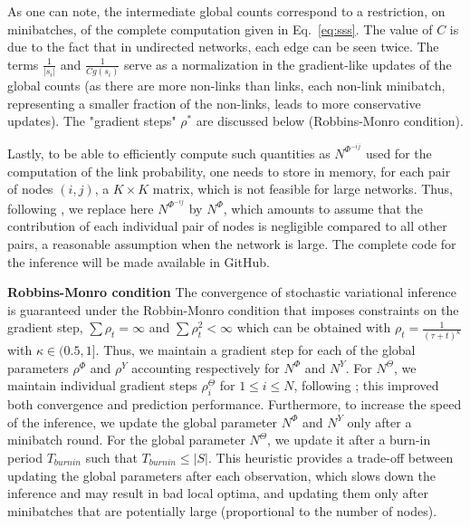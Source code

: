 %
As one can note, the intermediate global counts correspond to a restriction, on minibatches, of the complete computation given in Eq.~\ref{eq:sss}. The value of $C$ is due to the fact that in undirected networks, each edge can be seen twice. The terms $\frac{1}{|s_i|}$ and $\frac{1}{Cg(s_i)}$ serve as a normalization in the gradient-like updates of the global counts (as there are more non-links than links, each non-link minibatch, representing a smaller fraction of the non-links, leads to more conservative updates). The "gradient steps" $\rho^*$ are discussed below (Robbins-Monro condition).

Lastly, to be able to efficiently compute such quantities as $N^{\Phi^{-ij}}$ used for the computation of the link probability, one needs to store in memory, for each pair of nodes $(i,j)$, a $K \times K$ matrix, which is not feasible for large networks. Thus, following \cite{foulds2013stochastic}, we replace here $N^{\Phi^{-ij}}$ by $N^{\Phi}$, which amounts to assume that the contribution of each individual pair of nodes is negligible compared to all other pairs, a reasonable assumption when the network is large. The complete code for the inference will be made available in GitHub.

\textbf{Robbins-Monro condition} The convergence of stochastic variational inference is guaranteed under the Robbin-Monro condition \cite{robbins1951stochastic} that imposes constraints on the gradient step, $\sum \rho_t = \infty$ and $\sum \rho_t^2 < \infty$ which can be obtained with $\rho_t = \frac{1}{(\tau +t)^\kappa}$ with $\kappa \in (0.5, 1]$. Thus, we maintain a gradient step for each of the global parameters $\rho^\Phi$ and $\rho^Y$ accounting respectively for  $N^\Phi$ and $N^Y$. For $N^\Theta$, we maintain individual gradient steps $\rho_i^{\Theta}$ for $1\leq i\leq N$, following \cite{miller2009nonparametric}; this improved both convergence and prediction performance.%
 Furthermore, to increase the speed of the inference, we update the global parameter $N^\Phi$ and $N^Y$ only after a minibatch round. For the global parameter $N^\Theta$, we update it after a burn-in period $T_{burnin}$ such that $T_{burnin} \leq |S|$.
This heuristic provides a trade-off between updating the global parameters after each observation, which slows down the inference and may result in bad local optima, and updating them only after minibatches that are potentially large (proportional to the number of nodes).


